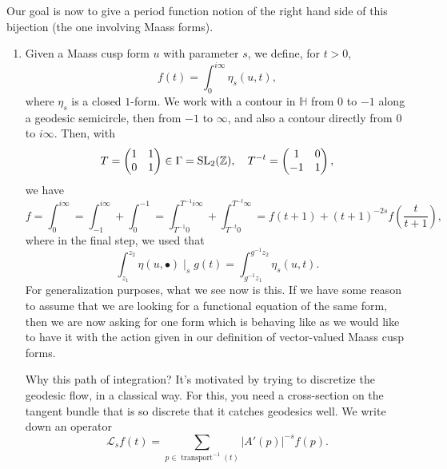 \documentclass[reqno]{amsart} 
\numberwithin{theorem}{section}
\numberwithin{equation}{section}
\begin{document}
Our goal is now to give a period function notion of the right hand side of this bijection (the one involving Maass forms).
\begin{enumerate}
\item Given a Maass cusp form $u$ with parameter $s$, we define, for $t > 0$,
  \begin{equation*}
    f(t) = \int_0^{i \infty} \eta_s(u, t),
  \end{equation*}
  where $\eta_s$ is a closed $1$-form.  We work with a contour in $\mathbb{H}$ from $0$ to $-1$ along a geodesic semicircle, then from $-1$ to $\infty$, and also a contour directly from $0$ to $i \infty$.  Then, with
  \begin{equation*}
    T =
    \begin{pmatrix}
      1      & 1 \\
      0 & 1 \\
    \end{pmatrix} \in \Gamma = \operatorname{SL}_2(\mathbb{Z}),
    \quad T^{-t} =
    \begin{pmatrix}
      1      & 0 \\
      -1 & 1 \\
    \end{pmatrix},
  \end{equation*}
  we have
  \begin{equation*}
    f = \int_0^{i \infty} = \int_{- 1}^{i \infty} + \int^{- 1}_0 = \int_{T^{-1} 0}^{T^{-1} i \infty} + \int_{T^{- t} 0}^{T^{- t} \infty}
    = f(t + 1) +(t + 1)^{- 2 s} f \left( \frac{t}{t + 1} \right),
  \end{equation*}
  where in the final step, we used that
  \begin{equation*}
    \int_{z_1}^{z_2} \eta(u, \bullet) \mid_s g(t) =
    \int_{g^{-1} z_1}^{g^{-1} z_2} \eta_s(u, t).
  \end{equation*}
  For generalization purposes, what we see now is this.  If we have some reason to assume that we are looking for a functional equation of the same form, then we are now asking for one form which is behaving like as we would like to have it with the action given in our definition of vector-valued Maass cusp forms.
  \begin{remark}
    Why this path of integration?  It's motivated by trying to discretize the geodesic flow, in a classical way.  For this, you need a cross-section on the tangent bundle that is so discrete that it catches geodesics well.  We write down an operator
    \begin{equation*}
      \mathcal{L}_s f(t) = \sum_{p \in \operatorname{transport}^{-1}(t)} \lvert A'(p) \rvert^{- s} f(p).

\end{equation*}
\end{remark}
\end{enumerate}
\end{document}
